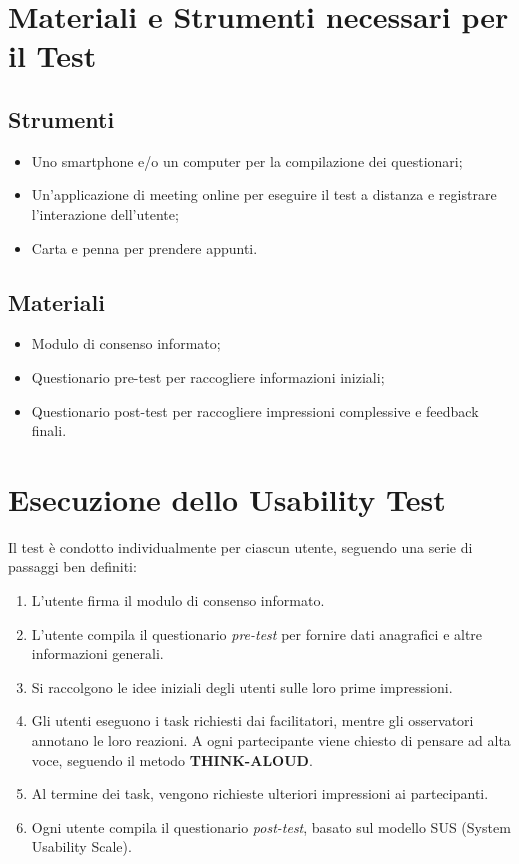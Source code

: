 \documentclass{article}
\begin{document}
\section{Materiali e Strumenti necessari per il Test}
\subsection*{Strumenti}
\begin{itemize}
    \item Uno smartphone e/o un computer per la compilazione dei questionari;
    \item Un’applicazione di meeting online per eseguire il test a distanza e registrare l’interazione dell’utente;
    \item Carta e penna per prendere appunti.
\end{itemize}

\subsection*{Materiali}
\begin{itemize}
    \item Modulo di consenso informato;
    \item Questionario pre-test per raccogliere informazioni iniziali;
    \item Questionario post-test per raccogliere impressioni complessive e feedback finali.
\end{itemize}

\section{Esecuzione dello Usability Test}
Il test è condotto individualmente per ciascun utente, seguendo una serie di passaggi ben definiti:

\begin{enumerate}
    \item L'utente firma il modulo di consenso informato.
    \item L'utente compila il questionario \textit{pre-test} per fornire dati anagrafici e altre informazioni generali.
    \item Si raccolgono le idee iniziali degli utenti sulle loro prime impressioni.
    \item Gli utenti eseguono i task richiesti dai facilitatori, mentre gli osservatori annotano le loro reazioni. A ogni partecipante viene chiesto di pensare ad alta voce, seguendo il metodo \textbf{THINK-ALOUD}.
    \item Al termine dei task, vengono richieste ulteriori impressioni ai partecipanti.
    \item Ogni utente compila il questionario \textit{post-test}, basato sul modello SUS (System Usability Scale).
\end{enumerate}
\end{document}
